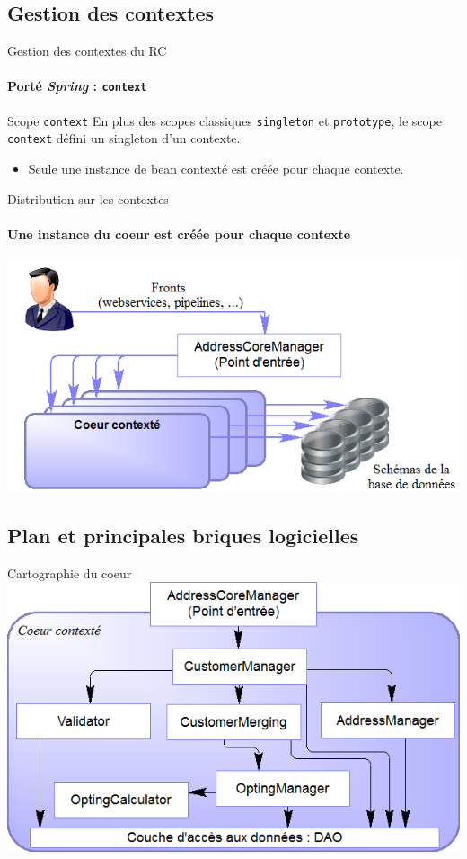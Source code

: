 \documentclass[compact]{beamer}%
\begin{document}
\subsection{Gestion des contextes}

\begin{frame}{Gestion des contextes du RC}
	\framesubtitle{Porté \emph{Spring} : \texttt{context}}
	
	\begin{block}{Scope \texttt{context}}
En plus des scopes classiques \texttt{singleton} et \texttt{prototype}, le scope \texttt{context} défini un singleton d'un contexte.	
	\end{block}
	
	\pause
	\begin{itemize}
	\item Seule une instance de bean contexté est créée pour chaque contexte.
	\end{itemize}


\end{frame}

\begin{frame}{Distribution sur les contextes}
	\framesubtitle{Une instance du coeur est créée pour chaque contexte}
	\includegraphics[width=\textwidth]{images/rc_arch_contexts.png}
\end{frame}


\subsection{Plan et principales briques logicielles}

\begin{frame}{Cartographie du coeur}
	\includegraphics[width=\textwidth]{images/rc_arch_business.png}
\end{frame}
\end{document}
